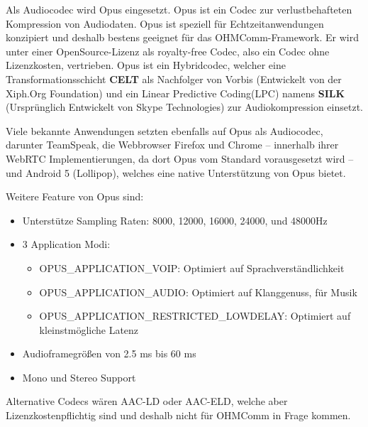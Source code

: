 Als Audiocodec wird Opus eingesetzt. Opus ist ein Codec zur verlustbehafteten Kompression von Audiodaten. Opus ist speziell für Echtzeitanwendungen konzipiert und deshalb bestens geeignet für das OHMComm-Framework. Er wird unter einer OpenSource-Lizenz als royalty-free Codec, also ein Codec ohne Lizenzkosten, vertrieben. Opus ist ein Hybridcodec, welcher eine Transformationsschicht \textbf{CELT} als Nachfolger von Vorbis (Entwickelt von der Xiph.Org Foundation) und ein Linear Predictive Coding(LPC) namens \textbf{SILK} (Ursprünglich Entwickelt von Skype Technologies) zur Audiokompression einsetzt.

Viele bekannte Anwendungen setzten ebenfalls auf Opus als Audiocodec, darunter TeamSpeak, die Webbrowser Firefox und Chrome -- innerhalb ihrer WebRTC Implementierungen, da dort Opus vom Standard vorausgesetzt wird -- und Android 5 (Lollipop), welches eine native Unterstützung von Opus bietet.

Weitere Feature von Opus sind:

\begin{itemize}
\label{Opus Sample Rate}
\item Unterstütze Sampling Raten: 8000, 12000, 16000, 24000, und 48000Hz
\item 3 Application Modi:
\begin{itemize}
\label{Opus Application Modi}
\item OPUS\_APPLICATION\_VOIP: Optimiert auf Sprachverständlichkeit
\item OPUS\_APPLICATION\_AUDIO: Optimiert auf Klanggenuss, für Musik
\item OPUS\_APPLICATION\_RESTRICTED\_LOWDELAY: Optimiert auf kleinstmögliche Latenz
\end{itemize}
\label{Opus Audioframe}
\item Audioframegrößen von 2.5 ms bis 60 ms
\item Mono und Stereo Support
\end{itemize}

Alternative Codecs wären AAC-LD oder AAC-ELD, welche aber Lizenzkostenpflichtig sind und deshalb nicht für OHMComm in Frage kommen.

